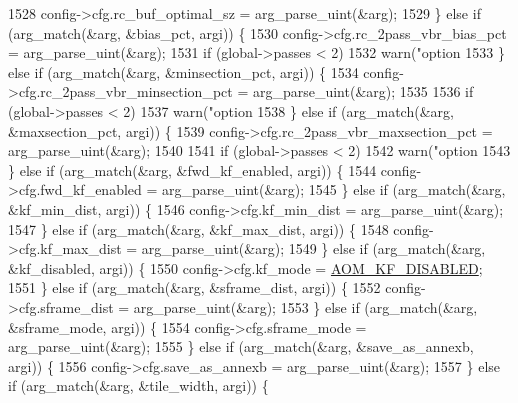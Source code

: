 \begin{DoxyCodeInclude}
{{{{{{{{{{{{{{{{{1528       config->cfg.rc\_buf\_optimal\_sz = arg\_parse\_uint(&arg);
1529     \} \textcolor{keywordflow}{else} \textcolor{keywordflow}{if} (arg\_match(&arg, &bias\_pct, argi)) \{
1530       config->cfg.rc\_2pass\_vbr\_bias\_pct = arg\_parse\_uint(&arg);
1531       \textcolor{keywordflow}{if} (global->passes < 2)
1532         warn(\textcolor{stringliteral}{"option %
1533     \} \textcolor{keywordflow}{else} \textcolor{keywordflow}{if} (arg\_match(&arg, &minsection\_pct, argi)) \{
1534       config->cfg.rc\_2pass\_vbr\_minsection\_pct = arg\_parse\_uint(&arg);
1535 
1536       \textcolor{keywordflow}{if} (global->passes < 2)
1537         warn(\textcolor{stringliteral}{"option %
1538     \} \textcolor{keywordflow}{else} \textcolor{keywordflow}{if} (arg\_match(&arg, &maxsection\_pct, argi)) \{
1539       config->cfg.rc\_2pass\_vbr\_maxsection\_pct = arg\_parse\_uint(&arg);
1540 
1541       \textcolor{keywordflow}{if} (global->passes < 2)
1542         warn(\textcolor{stringliteral}{"option %
1543     \} \textcolor{keywordflow}{else} \textcolor{keywordflow}{if} (arg\_match(&arg, &fwd\_kf\_enabled, argi)) \{
1544       config->cfg.fwd\_kf\_enabled = arg\_parse\_uint(&arg);
1545     \} \textcolor{keywordflow}{else} \textcolor{keywordflow}{if} (arg\_match(&arg, &kf\_min\_dist, argi)) \{
1546       config->cfg.kf\_min\_dist = arg\_parse\_uint(&arg);
1547     \} \textcolor{keywordflow}{else} \textcolor{keywordflow}{if} (arg\_match(&arg, &kf\_max\_dist, argi)) \{
1548       config->cfg.kf\_max\_dist = arg\_parse\_uint(&arg);
1549     \} \textcolor{keywordflow}{else} \textcolor{keywordflow}{if} (arg\_match(&arg, &kf\_disabled, argi)) \{
1550       config->cfg.kf\_mode = \hyperlink{group__encoder_ggac0498fc02cd368e6d9675cdb0bab5a84af81473ffe0169271763f9c9d05393405}{AOM\_KF\_DISABLED};
1551     \} \textcolor{keywordflow}{else} \textcolor{keywordflow}{if} (arg\_match(&arg, &sframe\_dist, argi)) \{
1552       config->cfg.sframe\_dist = arg\_parse\_uint(&arg);
1553     \} \textcolor{keywordflow}{else} \textcolor{keywordflow}{if} (arg\_match(&arg, &sframe\_mode, argi)) \{
1554       config->cfg.sframe\_mode = arg\_parse\_uint(&arg);
1555     \} \textcolor{keywordflow}{else} \textcolor{keywordflow}{if} (arg\_match(&arg, &save\_as\_annexb, argi)) \{
1556       config->cfg.save\_as\_annexb = arg\_parse\_uint(&arg);
1557     \} \textcolor{keywordflow}{else} \textcolor{keywordflow}{if} (arg\_match(&arg, &tile\_width, argi)) \{
}}}}}}}}}}}}}}}}}}}}
\end{DoxyCodeInclude}
